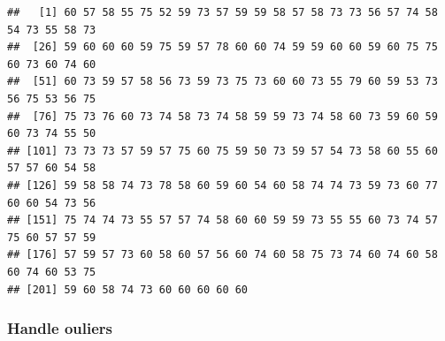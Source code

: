 \documentclass[
]{article}
\newenvironment{Shaded}{\begin{snugshade}}{\end{snugshade}}
\newcommand{\CommentTok}[1]{\textcolor[rgb]{0.56,0.35,0.01}{\textit{#1}}}
\newcommand{\FloatTok}[1]{\textcolor[rgb]{0.00,0.00,0.81}{#1}}
\newcommand{\FunctionTok}[1]{\textcolor[rgb]{0.13,0.29,0.53}{\textbf{#1}}}
\newcommand{\NormalTok}[1]{#1}
\newcommand{\OtherTok}[1]{\textcolor[rgb]{0.56,0.35,0.01}{#1}}
\newcommand{\SpecialCharTok}[1]{\textcolor[rgb]{0.81,0.36,0.00}{\textbf{#1}}}
\begin{document}
\begin{Shaded}
\end{Shaded}

\begin{verbatim}
##   [1] 60 57 58 55 75 52 59 73 57 59 59 58 57 58 73 73 56 57 74 58 54 73 55 58 73
##  [26] 59 60 60 60 59 75 59 57 78 60 60 74 59 59 60 60 59 60 75 75 60 73 60 74 60
##  [51] 60 73 59 57 58 56 73 59 73 75 73 60 60 73 55 79 60 59 53 73 56 75 53 56 75
##  [76] 75 73 76 60 73 74 58 73 74 58 59 59 73 74 58 60 73 59 60 59 60 73 74 55 50
## [101] 73 73 73 57 59 57 75 60 75 59 50 73 59 57 54 73 58 60 55 60 57 57 60 54 58
## [126] 59 58 58 74 73 78 58 60 59 60 54 60 58 74 74 73 59 73 60 77 60 60 54 73 56
## [151] 75 74 74 73 55 57 57 74 58 60 60 59 59 73 55 55 60 73 74 57 75 60 57 57 59
## [176] 57 59 57 73 60 58 60 57 56 60 74 60 58 75 73 74 60 74 60 58 60 74 60 53 75
## [201] 59 60 58 74 73 60 60 60 60 60
\end{verbatim}

\subsubsection{Handle ouliers}\label{handle-ouliers-1}

\begin{Shaded}
\end{Shaded}
\end{document}
